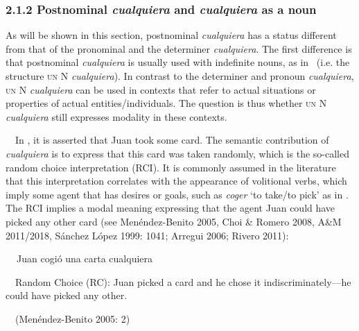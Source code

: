 \subsubsection[2.1.2 Postnominal cualquiera and cualquiera as a noun]{\textbf{2.1.2 Postnominal }\textbf{\textit{cualquiera}}\textbf{\textit{ }}\textbf{and }\textbf{\textit{cualquiera}}\textbf{ as a noun}}
\begin{styleStandard}
As will be shown in this section, postnominal \textit{cualquiera} has a status different from that of the pronominal and the determiner \textit{cualquiera}. The first difference is that postnominal \textit{cualquiera} is usually used with indefinite nouns, as in \ (i.e. the structure \textsc{un} N \textit{cualquiera}). In contrast to the determiner and pronoun \textit{cualquiera}, \textsc{un} N \textit{cualquiera} can be used in contexts that refer to actual situations or properties of actual entities/individuals. The question is thus whether \textsc{un} N \textit{cualquiera} still expresses modality in these contexts.
\end{styleStandard}

\begin{styleStandard}
\ \ In , it is asserted that Juan took some card. The semantic contribution of \textit{cualquiera} is to express that this card was taken randomly, which is the so-called random choice interpretation (RCI). It is commonly assumed in the literature that this interpretation correlates with the appearance of volitional verbs, which imply some agent that has desires or goals, such as \textit{coger }‘to take/to pick’ as in . The RCI implies a modal meaning expressing that the agent Juan could have picked any other card (see Menéndez-Benito 2005, Choi \& Romero 2008, A\&M 2011/2018, Sánchez López 1999: 1041; Arregui 2006; Rivero 2011):
\end{styleStandard}

\begin{styleStandard}
\label{bkm:Ref533761157}\textbf{\ \ }Juan cogió una carta cualquiera
\end{styleStandard}

\begin{styleStandard}
\ \ Random Choice (RC): Juan picked a card and he chose it indiscriminately—he could have picked any other.
\end{styleStandard}

\begin{styleStandard}
\ \ (Menéndez-Benito 2005: 2)
\end{styleStandard}

